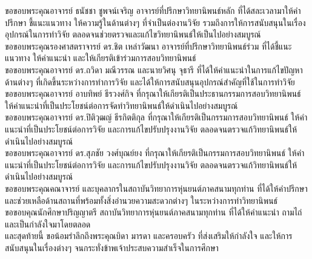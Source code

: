 \begin{acknowledgements}
\hspace*{10mm} ขอขอบพระคุณอาจารย์ ธนัชชา ชูพจน์เจริญ อาจารย์ที่ปรึกษาวิทยานิพนธ์หลัก
ที่ได้สละเวลามาให้คำปรึกษา ชี้แนะแนวทาง ให้ความรู้ในด้านต่างๆ ที่จำเป็นต่องานวิจัย รวมถึงการให้การสนับสนุนในเรื่องอุปกรณ์ในการทำวิจัย
ตลอดจนช่วยตรวจและแก้ไขวิทยานิพนธ์ให้เป็นไปอย่างสมบูรณ์\\
\hspace*{10mm} ขอขอบพระคุณรองศาสตราจารย์ ดร.ชิต เหล่าวัฒนา อาจารย์ที่ปรึกษาวิทยานิพนธ์ร่วม
ที่ได้ชี้แนะแนวทาง ให้คำแนะนำ และให้เกียรติเข้าร่วมการสอบวิทยานิพนธ์\\
\hspace*{10mm} ขอขอบพระคุณอาจารย์ ดร.ถวิดา มณีวรรณ และนายวิศนุ จุธารี ที่ได้ให้คำแนะนำในการแก้ไขปัญหาด้านต่างๆ
ที่เกิดขึ้นระหว่างการทำการวิจัย และได้ให้การสนับสนุนอุปกรณ์สำคัญที่ใช้ในการทำวิจัย\\
\hspace*{10mm} ขอขอบพระคุณอาจารย์ อาบทิพย์ ธีรวงศ์กิจ ที่กรุณาให้เกียรติเป็นประธานกรรมการสอบวิทยานิพนธ์
ให้คำแนะนำที่เป็นประโยชน์ต่อการจัดทำวิทยานิพนธ์ให้ดำเนินไปอย่างสมบูรณ์\\
\hspace*{10mm} ขอขอบพระคุณอาจารย์ ดร.ปิติวุฒญ์ ธีรกิตติกุล ที่กรุณาให้เกียรติเป็นกรรมการสอบวิทยานิพนธ์ 
ให้คำแนะนำที่เป็นประโยชน์ต่อการวิจัย และการแก้ไขปรับปรุงงานวิจัย ตลอดจนตรวจแก้วิทยานิพนธ์ให้ดำเนินไปอย่างสมบูรณ์\\
\hspace*{10mm} ขอขอบพระคุณอาจารย์ ดร.สุภชัย วงศ์บุณย์ยง ที่กรุณาให้เกียรติเป็นกรรมการสอบวิทยานิพนธ์ 
ให้คำแนะนำที่เป็นประโยชน์ต่อการวิจัย และการแก้ไขปรับปรุงงานวิจัย ตลอดจนตรวจแก้วิทยานิพนธ์ให้ดำเนินไปอย่างสมบูรณ์\\
\hspace*{10mm} ขอขอบพระคุณคณาจารย์ และบุคลากรในสถาบันวิทยาการหุ่นยนต์ภาคสนามทุกท่าน
ที่ได้ให้คำปรึกษาและช่วยเหลือด้านสถานที่พร้อมทั้งสิ่งอำนวยความสะดวกต่างๆ ในระหว่างการทำวิทยานิพนธ์\\
\hspace*{10mm} ขอขอบคุณนักศึกษาปริญญาตรี สถาบันวิทยาการหุ่นยนต์ภาคสนามทุกท่าน
ที่ได้ให้คำแนะนำ ถามไถ่ และเป็นกำลังใจมาโดยตลอด\\
\hspace*{10mm} และสุดท้ายนี้ ขอน้อมรำลึกถึงพระคุณบิดา มารดา และครอบครัว ที่ส่งเสริมให้กำลังใจ
และให้การสนับสนุนในเรื่องต่างๆ จนกระทั่งข้าพเจ้าประสบความสำเร็จในการศึกษา\\
\end{acknowledgements}